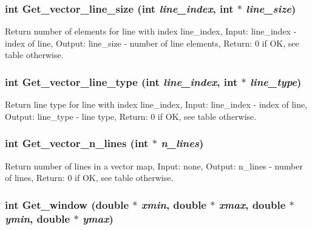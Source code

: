 \hypertarget{GisApi_8C_a29}{
\subsubsection[Get\_\-vector\_\-line\_\-size]{\setlength{\rightskip}{0pt plus 5cm}int Get\_\-vector\_\-line\_\-size (int {\em line\_\-index}, int $\ast$ {\em line\_\-size})}}
\label{GisApi_8C_a29}


Return number of elements for line with index line\_\-index, Input: line\_\-index - index of line, Output: line\_\-size - number of line elements, Return: 0 if OK, see table otherwise. 

\hypertarget{GisApi_8C_a27}{
\subsubsection[Get\_\-vector\_\-line\_\-type]{\setlength{\rightskip}{0pt plus 5cm}int Get\_\-vector\_\-line\_\-type (int {\em line\_\-index}, int $\ast$ {\em line\_\-type})}}
\label{GisApi_8C_a27}


Return line type for line with index line\_\-index, Input: line\_\-index - index of line, Output: line\_\-type - line type, Return: 0 if OK, see table otherwise. 

\hypertarget{GisApi_8C_a26}{
\subsubsection[Get\_\-vector\_\-n\_\-lines]{\setlength{\rightskip}{0pt plus 5cm}int Get\_\-vector\_\-n\_\-lines (int $\ast$ {\em n\_\-lines})}}
\label{GisApi_8C_a26}


Return number of lines in a vector map, Input: none, Output: n\_\-lines - number of lines, Return: 0 if OK, see table otherwise. 

\hypertarget{GisApi_8C_a60}{
\subsubsection[Get\_\-window]{\setlength{\rightskip}{0pt plus 5cm}int Get\_\-window (double $\ast$ {\em xmin}, double $\ast$ {\em xmax}, double $\ast$ {\em ymin}, double $\ast$ {\em ymax})}}
\label{GisApi_8C_a60}


